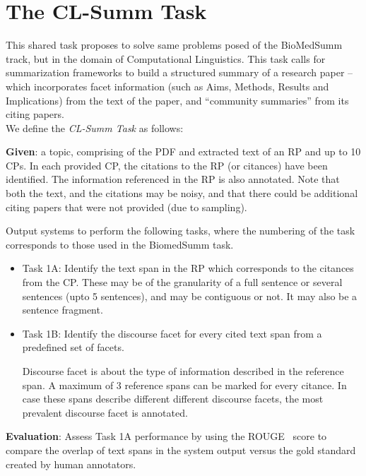 \documentclass[11pt]{article}
\begin{document}

\section{The CL-Summ Task}
This shared task proposes to solve same problems posed of the
BioMedSumm track, but in the domain of Computational Linguistics. This
task calls for summarization frameworks to build a structured summary
of a research paper -- which incorporates facet information (such as
Aims, Methods, Results and Implications) from the text of the paper,
and ``community summaries'' from its citing papers. \\

\noindent We define the {\it CL-Summ Task} as follows:

{\bf Given}: a topic, comprising of the PDF and extracted text of an RP and
up to 10 CPs.  In each provided CP, the citations to the RP (or
citances) have been identified. The information referenced in the RP
is also annotated.  Note that both the text, and the citations may be
noisy, and that there could be additional citing papers that were not
provided (due to sampling).

Output systems to perform the following tasks, where the numbering of
the task corresponds to those used in the BiomedSumm task.

\begin{itemize}
\item Task 1A: Identify the text span in the RP which corresponds to
  the citances from the CP. These may be of the granularity of a full
  sentence or several sentences (upto 5 sentences), and may be contiguous or not. It may
  also be a sentence fragment.

\item Task 1B: Identify the discourse facet for every cited text span
  from a predefined set of facets.

Discourse facet is about the type of information described in the 
reference span. A maximum of 3 reference spans can be marked for 
every citance. In case these spans describe different different 
discourse facets, the most prevalent discourse facet is annotated.

\end{itemize}
 
{\bf Evaluation}: Assess Task 1A performance by using the
ROUGE~\cite{Lin:2004} score to compare the overlap of text spans in
the system output versus the gold standard created by human
annotators.
\end{document}
